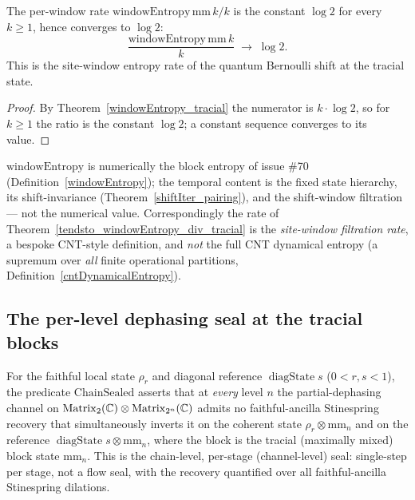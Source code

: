 \begin{theorem}\label{tendsto_windowEntropy_div_tracial}
  \leanok
  The per-window rate \(\mathrm{windowEntropy}\,\mathrm{mm}\,k / k\) is the constant \(\log 2\) for
  every \(k\ge 1\), hence converges to \(\log 2\):
  \[
    \frac{\mathrm{windowEntropy}\,\mathrm{mm}\,k}{k} \;\longrightarrow\; \log 2.
  \]
  This is the site-window entropy rate of the quantum Bernoulli shift at the tracial state.
\end{theorem}
\begin{proof}\leanok
  By Theorem~\ref{windowEntropy_tracial} the numerator is \(k\cdot\log 2\), so for \(k\ge 1\) the ratio
  is the constant \(\log 2\); a constant sequence converges to its value.
\end{proof}

\begin{remark}\label{qbs-scope-rate}
  \(\mathrm{windowEntropy}\) is numerically the block entropy of issue \#70
  (Definition~\ref{windowEntropy}); the temporal content is the fixed state hierarchy, its
  shift-invariance (Theorem~\ref{shiftIter_pairing}), and the shift-window filtration --- not the
  numerical value. Correspondingly the rate of Theorem~\ref{tendsto_windowEntropy_div_tracial} is the
  \emph{site-window filtration rate}, a bespoke CNT-style definition, and \emph{not} the full CNT
  dynamical entropy (a supremum over \emph{all} finite operational partitions,
  Definition~\ref{cntDynamicalEntropy}).
\end{remark}

\subsection{The per-level dephasing seal at the tracial blocks}

\begin{definition}\label{ChainSealed}
  \leanok
  For the faithful local state \(\rho_r\) and diagonal reference \(\operatorname{diagState} s\)
  (\(0<r,s<1\)), the predicate \(\mathrm{ChainSealed}\) asserts that at \emph{every} level \(n\) the
  partial-dephasing channel on \(\operatorname{Matrix}_2(\mathbb{C})\otimes\operatorname{Matrix}_{2^{n}}(\mathbb{C})\) admits no faithful-ancilla
  Stinespring recovery that simultaneously inverts it on the coherent state
  \(\rho_r\otimes\mathrm{mm}_n\) and on the reference \(\operatorname{diagState} s\otimes\mathrm{mm}_n\),
  where the block is the tracial (maximally mixed) block state \(\mathrm{mm}_n\). This is the
  chain-level, per-stage (channel-level) seal: single-step per stage, not a flow seal, with the
  recovery quantified over all faithful-ancilla Stinespring dilations.
\end{definition}

